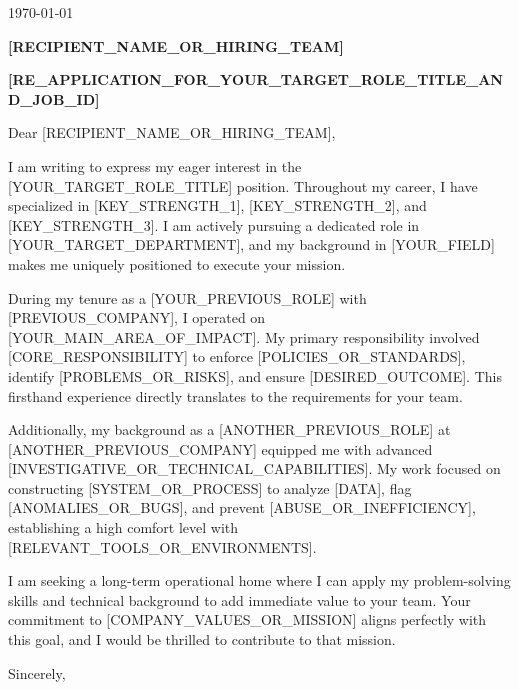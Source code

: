 \documentclass[letterpaper,11pt]{article}
\begin{document}
\makeHeader

\vspace{2em}

\today

\vspace{1em}
\noindent\textbf{[RECIPIENT\_NAME\_OR\_HIRING\_TEAM]}  

\vspace{2em}

\noindent\textbf{[RE\_APPLICATION\_FOR\_YOUR\_TARGET\_ROLE\_TITLE\_AND\_JOB\_ID]}

\vspace{1em}

\noindent Dear [RECIPIENT\_NAME\_OR\_HIRING\_TEAM],

\vspace{1em}

\noindent I am writing to express my eager interest in the [YOUR\_TARGET\_ROLE\_TITLE] position. Throughout my career, I have specialized in [KEY\_STRENGTH\_1], [KEY\_STRENGTH\_2], and [KEY\_STRENGTH\_3]. I am actively pursuing a dedicated role in [YOUR\_TARGET\_DEPARTMENT], and my background in [YOUR\_FIELD] makes me uniquely positioned to execute your mission.

\vspace{1em}
\noindent During my tenure as a [YOUR\_PREVIOUS\_ROLE] with [PREVIOUS\_COMPANY], I operated on [YOUR\_MAIN\_AREA\_OF\_IMPACT]. My primary responsibility involved [CORE\_RESPONSIBILITY] to enforce [POLICIES\_OR\_STANDARDS], identify [PROBLEMS\_OR\_RISKS], and ensure [DESIRED\_OUTCOME]. This firsthand experience directly translates to the requirements for your team.

\vspace{1em}
\noindent Additionally, my background as a [ANOTHER\_PREVIOUS\_ROLE] at [ANOTHER\_PREVIOUS\_COMPANY] equipped me with advanced [INVESTIGATIVE\_OR\_TECHNICAL\_CAPABILITIES]. My work focused on constructing [SYSTEM\_OR\_PROCESS] to analyze [DATA], flag [ANOMALIES\_OR\_BUGS], and prevent [ABUSE\_OR\_INEFFICIENCY], establishing a high comfort level with [RELEVANT\_TOOLS\_OR\_ENVIRONMENTS].

\vspace{1em}
\noindent I am seeking a long-term operational home where I can apply my problem-solving skills and technical background to add immediate value to your team. Your commitment to [COMPANY\_VALUES\_OR\_MISSION] aligns perfectly with this goal, and I would be thrilled to contribute to that mission.

\vspace{1em}

\vspace{1em}

\noindent Sincerely,

\vspace{1.5em}

\noindent \textbf{\myName}
\end{document}
